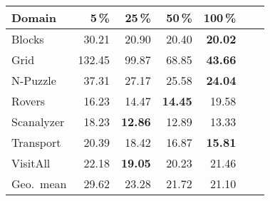 \begin{tabular}{lrrrrrr}
    Domain & 5\,\% & 25\,\% & 50\,\% & 100\,\% \\
    \midrule
    Blocks & 30.21 & 20.90 & 20.40 & \textbf{20.02} \\
    Grid & 132.45 & 99.87 & 68.85 & \textbf{43.66} \\
    N-Puzzle & 37.31 & 27.17 & 25.58 & \textbf{24.04} \\
    Rovers & 16.23 & 14.47 & \textbf{14.45} & 19.58 \\
    Scanalyzer & 18.23 & \textbf{12.86} & 12.89 & 13.33 \\
    Transport & 20.39 & 18.42 & 16.87 & \textbf{15.81} \\
    VisitAll & 22.18 & \textbf{19.05} & 20.23 & 21.46 \\ 
    \midrule
    Geo.~mean & 29.62 & 23.28 & 21.72 & 21.10 \\
\end{tabular}
